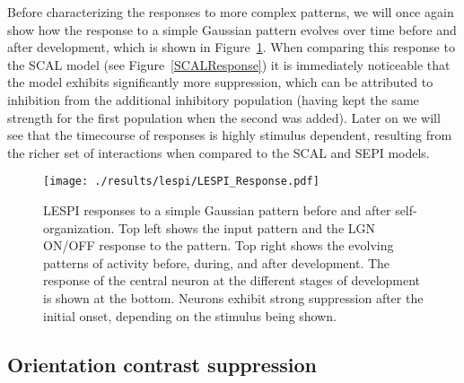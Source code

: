 Before characterizing the responses to more complex patterns, we will
once again show how the response to a simple Gaussian pattern evolves
over time before and after development, which is shown in
Figure~\ref{LESPIResponse}. When comparing this response to the SCAL
model (see Figure~\ref{SCALResponse}) it is immediately noticeable
that the model exhibits significantly more suppression, which can be
attributed to inhibition from the additional inhibitory
population (having kept the same strength for the first population
when the second was added). Later on we will see that the timecourse
of responses is highly stimulus dependent, resulting from the richer set of
interactions when compared to the SCAL and SEPI models.

\begin{figure}
	\centering
    \texttt{[image: ./results/lespi/LESPI\_Response.pdf]}
	\caption[LESPI responses to a simple Gaussian pattern before and
      after self-organization.]{LESPI responses to a simple Gaussian
      pattern before and after self-organization. Top left shows the
      input pattern and the LGN ON/OFF response to the pattern. Top
      right shows the evolving patterns of activity before, during, and
      after development. The response of the central neuron at the
      different stages of development is shown at the bottom. Neurons
      exhibit strong suppression after the initial onset, depending on
      the stimulus being shown.}
	\label{LESPIResponse}
\end{figure}

\subsection{Orientation contrast suppression}

